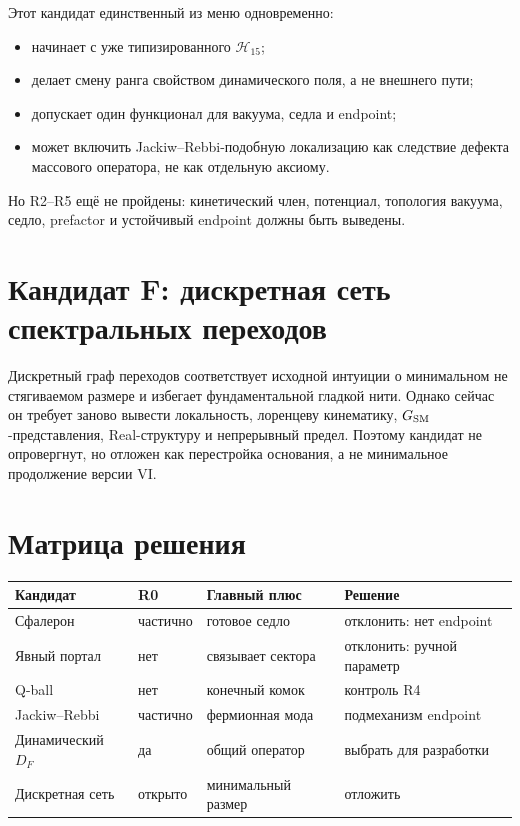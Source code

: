 Этот кандидат единственный из меню одновременно:
\begin{itemize}
 \item начинает с уже типизированного $\mathcal H_{15}$;
 \item делает смену ранга свойством динамического поля, а не внешнего пути;
 \item допускает один функционал для вакуума, седла и endpoint;
 \item может включить Jackiw--Rebbi-подобную локализацию как следствие
 дефекта массового оператора, не как отдельную аксиому.
\end{itemize}
Но R2--R5 ещё не пройдены: кинетический член, потенциал, топология вакуума,
седло, prefactor и устойчивый endpoint должны быть выведены.

\section{Кандидат F: дискретная сеть спектральных переходов}

Дискретный граф переходов соответствует исходной интуиции о минимальном
не стягиваемом размере и избегает фундаментальной гладкой нити. Однако
сейчас он требует заново вывести локальность, лоренцеву кинематику,
$G_{\rm SM}$-представления, Real-структуру и непрерывный предел. Поэтому
кандидат не опровергнут, но отложен как перестройка основания, а не
минимальное продолжение версии VI.

\section{Матрица решения}

\begin{center}
\begin{tabular}{>{\raggedright\arraybackslash}p{}
                  >{\raggedright\arraybackslash}p{}
                  >{\raggedright\arraybackslash}p{}
                  >{\raggedright\arraybackslash}p{}}
\toprule
Кандидат & R0 & Главный плюс & Решение \\
\midrule
Сфалерон & частично & готовое седло & отклонить: нет endpoint \\
Явный портал & нет & связывает сектора & отклонить: ручной параметр \\
Q-ball & нет & конечный комок & контроль R4 \\
Jackiw--Rebbi & частично & фермионная мода & подмеханизм endpoint \\
Динамический $D_F$ & да & общий оператор & выбрать для разработки \\
Дискретная сеть & открыто & минимальный размер & отложить \\
\bottomrule
\end{tabular}
\end{center}

